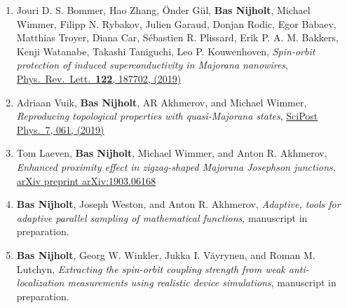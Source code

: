 \begin{enumerate}
\item Jouri D. S. Bommer, Hao Zhang, {\"O}nder G{\"u}l, \textbf{Bas Nijholt}, Michael Wimmer, Filipp N. Rybakov, Julien Garaud, Donjan Rodic, Egor Babaev, Matthias Troyer, Diana Car, S{\'e}bastien R. Plissard, Erik P. A. M. Bakkers, Kenji Watanabe, Takashi Taniguchi, Leo P. Kouwenhoven, \textit{Spin-orbit protection of induced superconductivity in Majorana nanowires}, \href{https://doi.org/10.1103/PhysRevLett.122.187702}{Phys.~Rev.~Lett.~\textbf{122}, 187702, (2019)}

\item Adriaan Vuik, \textbf{Bas Nijholt}, AR Akhmerov, and Michael Wimmer, \textit{Reproducing topological properties with quasi-Majorana states}, \href{https://doi.org/10.21468/SciPostPhys.7.5.061}{SciPost Phys.~\textrm{7}, 061, (2019)}

\item Tom Laeven, \textbf{Bas Nijholt}, Michael Wimmer, and Anton R. Akhmerov, \textit{Enhanced proximity effect in zigzag-shaped Majorana Josephson junctions}, \href{https://arxiv.org/abs/1903.06168}{arXiv preprint arXiv:1903.06168}

\item \textbf{Bas Nijholt}, Joseph Weston, and Anton R. Akhmerov, \textit{Adaptive, tools for adaptive parallel sampling of mathematical functions}, manuscript in preparation.

\item \textbf{Bas Nijholt}, Georg W. Winkler, Jukka I. V{\"a}yrynen, and Roman M. Lutchyn, \textit{Extracting the spin-orbit coupling strength from weak anti-localization measurements using realistic device simulations}, manuscript in preparation.

\end{enumerate}

